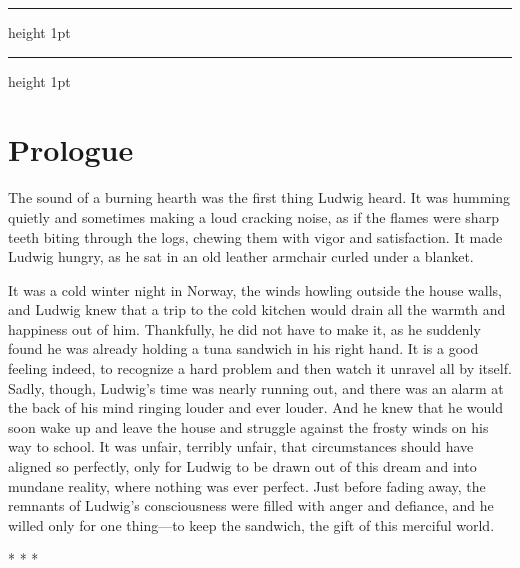 \documentclass[openany, oneside]{book}
\begin{document}
\thispagestyle{empty}

\phantom{}

\begin{center}
\vspace{4cm}
\hrule height 1pt
\vspace{1cm}
\\
\vspace{1cm}
\hrule height 1pt
\vspace{1cm}
\end{center}

\pagebreak

\newcommand{\sep}{\begin{center}
    * * *
\end{center}}

\chapter*{Prologue}

The sound of a burning hearth was the first thing Ludwig heard.
It was humming quietly and sometimes making a loud cracking noise, as if the flames were sharp teeth biting through the logs, chewing them with vigor and satisfaction.
It made Ludwig hungry, as he sat in an old leather armchair curled under a blanket.

It was a cold winter night in Norway, the winds howling outside the house walls, and Ludwig knew that a trip to the cold kitchen would drain all the warmth and happiness out of him.
Thankfully, he did not have to make it, as he suddenly found he was already holding a tuna sandwich in his right hand.
It is a good feeling indeed, to recognize a hard problem and then watch it unravel all by itself.
Sadly, though, Ludwig's time was nearly running out, and there was an alarm at the back of his mind ringing louder and ever louder.
And he knew that he would soon wake up and leave the house and struggle against the frosty winds on his way to school.
It was unfair, terribly unfair, that circumstances should have aligned so perfectly, only for Ludwig to be drawn out of this dream and into mundane reality, where nothing was ever perfect.
Just before fading away, the remnants of Ludwig's consciousness were filled with anger and defiance, and he willed only for one thing---to keep the sandwich, the gift of this merciful world.

\sep
\end{document}
